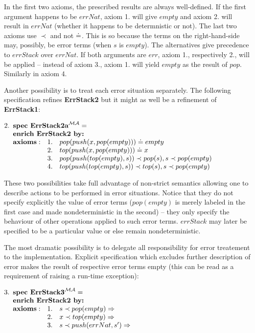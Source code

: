 \documentclass[10pt]{article}
\begin{document}
\noindent
In the first two axioms, the prescribed results are always well-defined. If
the first argument happens to be $errNat$, axiom 1. will give $empty$ and
axiom 2. will result in $errNat$ (whether it happens to be determnistic or
not).
The last two axioms use $\prec$ and not $\mathrel{\dot{=} }$. This is so
because the terms on the right-hand-side may, possibly, be error terms (when
$s$ is $empty$). The alternatives give precedence to
$errStack$ over $errNat$. If both arguments are $err$, axiom 1.,
respectively 2., will be applied -- instead of axiom 3., axiom 1. will yield $empty$
as the result of $pop$. Similarly in axiom 4.

Another possibility is to treat each error situation separately. The
following specification refines {\bf ErrStack2} but it might as well be a
refinement of {\bf ErrStack1}: \vspace*{1ex}

\(
2. \spec{	\tit{\mbox{\bf spec\ ErrStack2a}^{\inst{MA}}=} \\
	\tit{\mbox{\bf enrich\ ErrStack2\  by:}} \\
	 	{\bf axioms:}
			&1.& pop(push(x,pop(empty)))\eleq empty \\
			&2.& top(push(x,pop(empty)))\eleq x \\
			&3.& pop(push(top(empty),s))\prec pop(s), s\prec pop(empty) \\
			&4.& top(push(top(empty),s))\prec top(s), s\prec pop(empty) 
}
\)

\noindent
These two possibilities take full advantage of non-strict semantics allowing
one to describe actions to be performed in error situations. Notice that they
do not specify explicitly the value of error terms ($pop(empty)$ is merely
labeled in the first case and made nondeterministic in the second) -- they
only specify the behaviour of other operations applied to such error
terms. $errStack$ may later be specified to be a particular value or else remain nondeterministic.

The most dramatic possibility is to delegate all responsibility for error
treatement to the implementation. Explicit specification which excludes further
description of error makes the result of respective error terms empty (this
can be read as a requirement of raising a run-time exception): \vspace*{1ex}

\(
3. \spec{	\tit{\mbox{\bf spec\ ErrStack3}^{\inst{MA}}=} \\
	\tit{\mbox{\bf enrich\ ErrStack2\  by:}} \\
	 	{\bf axioms:}
			&1.& s \prec pop(empty) \To  \\
			&2.& x \prec top(empty) \To \\
			&3.& s \prec push(errNat,s') \To
}
\)
\end{document}
